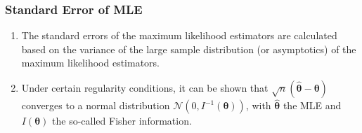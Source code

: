 \subsubsection{Standard Error of MLE}

\begin{enumerate}
    \item The standard errors of the maximum likelihood estimators are calculated based on the variance of the large sample distribution (or asymptotics) of the maximum likelihood estimators.
    \hfill \cite{statistics/book/Statistics-for-Data-Scientists/Maurits-Kaptein}

    \item Under certain regularity conditions, it can be shown that $\sqrt{n}(\hat{\bm{\theta}} - \bm{\theta})$ converges to a normal distribution $\mathcal{N} (0, I ^{-1} (\bm{\theta}))$, with $\hat{\bm{\theta}}$ the MLE and $I (\bm{\theta})$ the so-called Fisher information.
    \hfill \cite{statistics/book/Statistics-for-Data-Scientists/Maurits-Kaptein}
\end{enumerate}


